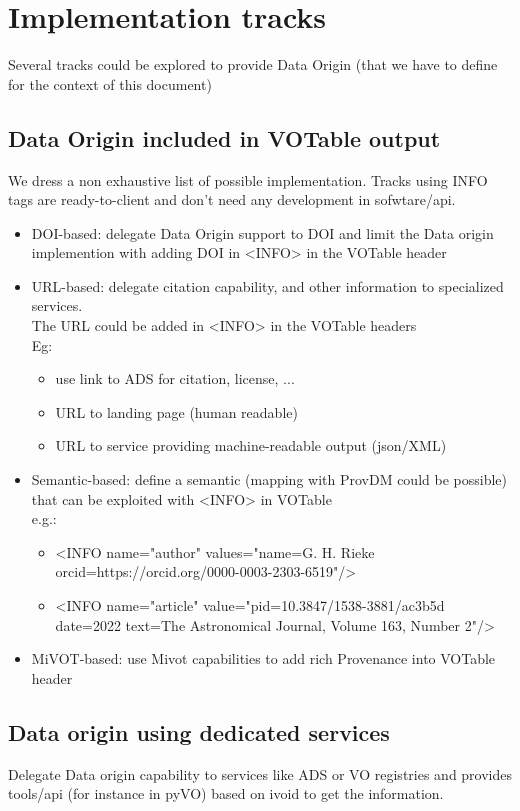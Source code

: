 \documentclass[11pt,a4paper]{ivoa}
\begin{document}
\section{Implementation tracks}
Several tracks could be explored to provide Data Origin (that we have to define for the context of this document)

\subsection{Data Origin included in VOTable output}
We dress a non exhaustive  list of possible implementation. Tracks using INFO tags are ready-to-client and don't need any development in sofwtare/api.

\begin{itemize}
    \item DOI-based: delegate Data Origin support to DOI and limit the Data origin implemention with adding DOI in <INFO> in the VOTable header
    \item URL-based: delegate citation capability, and other information to specialized services.\\
	The URL could be added in <INFO> in the VOTable headers \\
	Eg: \begin{itemize}
		\item use link to ADS for citation, license, ...
		\item URL to landing page (human readable)
		\item URL to service providing machine-readable output (json/XML)
	\end{itemize}
	\item Semantic-based: define a semantic (mapping with ProvDM could be possible) that can be exploited with <INFO>  in VOTable \\
	e.g.: \begin{itemize}
		\item <INFO name="author" values="name=G. H. Rieke orcid=https://orcid.org/0000-0003-2303-6519"/>
		\item <INFO name="article" value="pid=10.3847/1538-3881/ac3b5d   date=2022  text=The Astronomical Journal, Volume 163, Number 2"/>
		\end{itemize}
	\item MiVOT-based: use Mivot capabilities to add rich Provenance into VOTable header

\end{itemize}

\subsection{Data origin  using dedicated services}
Delegate Data origin capability to services like ADS or VO registries and provides tools/api (for instance in pyVO)  based on ivoid to get the information. 
\end{document}
